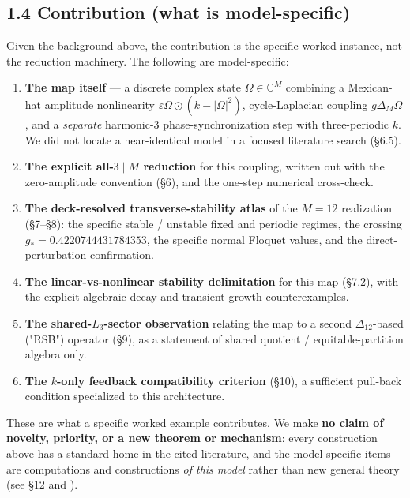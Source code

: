 \documentclass[
  11pt,
  a4paper,
]{article}
\providecommand{\tightlist}{%
  \setlength{\itemsep}{0pt}\setlength{\parskip}{0pt}}
\begin{document}
\subsection{1.4 Contribution (what is model-specific)}\label{contribution-what-is-model-specific}

Given the background above, the contribution is the specific worked instance, not the reduction machinery. The following are model-specific:

\begin{enumerate}
\def\labelenumi{\arabic{enumi}.}
\tightlist
\item
  \textbf{The map itself} --- a discrete complex state \(\Omega\in\mathbb C^M\) combining a Mexican-hat amplitude nonlinearity \(\varepsilon\Omega\odot(k-|\Omega|^2)\), cycle-Laplacian coupling \(g\Delta_M\Omega\), and a \emph{separate} harmonic-3 phase-synchronization step with three-periodic \(k\). We did not locate a near-identical model in a focused literature search (§6.5).
\item
  \textbf{The explicit all-\(3\mid M\) reduction} for this coupling, written out with the zero-amplitude convention (§6), and the one-step numerical cross-check.
\item
  \textbf{The deck-resolved transverse-stability atlas} of the \(M=12\) realization (§7--§8): the specific stable / unstable fixed and periodic regimes, the crossing \(g_\ast=0.4220744431784353\), the specific normal Floquet values, and the direct-perturbation confirmation.
\item
  \textbf{The linear-vs-nonlinear stability delimitation} for this map (§7.2), with the explicit algebraic-decay and transient-growth counterexamples.
\item
  \textbf{The shared-\(L_3\)-sector observation} relating the map to a second \(\Delta_{12}\)-based ("RSB") operator (§9), as a statement of shared quotient / equitable-partition algebra only.
\item
  \textbf{The \(k\)-only feedback compatibility criterion} (§10), a sufficient pull-back condition specialized to this architecture.
\end{enumerate}

These are what a specific worked example contributes. We make \textbf{no claim of novelty, priority, or a new theorem or mechanism}: every construction above has a standard home in the cited literature, and the model-specific items are computations and constructions \emph{of this model} rather than new general theory (see §12 and ).
\end{document}
